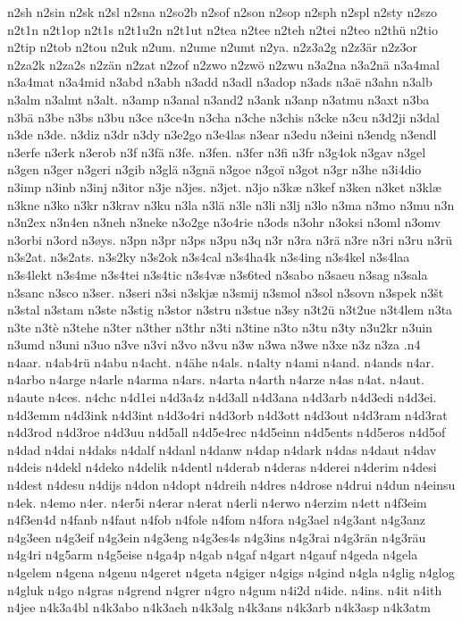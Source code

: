 {{n2sh
n2sin
n2sk
n2sl
n2sna
n2so2b
n2sof
n2son
n2sop
n2sph
n2spl
n2sty
n2szo
n2t1n
n2t1op
n2t1s
n2t1u2n
n2t1ut
n2tea
n2tee
n2teh
n2tei
n2teo
n2thü
n2tio
n2tip
n2tob
n2tou
n2uk
n2um.
n2ume
n2umt
n2ya.
n2z3a2g
n2z3är
n2z3or
n2za2k
n2za2s
n2zän
n2zat
n2zof
n2zwo
n2zwö
n2zwu
n3a2na
n3a2nä
n3a4mal
n3a4mat
n3a4mid
n3abd
n3abh
n3add
n3adl
n3adop
n3ads
n3aë
n3ahn
n3alb
n3alm
n3almt
n3alt.
n3amp
n3anal
n3and2
n3ank
n3anp
n3atmu
n3axt
n3ba
n3bä
n3be
n3bs
n3bu
n3ce
n3ce4n
n3cha
n3che
n3chis
n3cke
n3cu
n3d2ji
n3dal
n3de
n3de.
n3diz
n3dr
n3dy
n3e2go
n3e4las
n3ear
n3edu
n3eini
n3endg
n3endl
n3erfe
n3erk
n3erob
n3f
n3fä
n3fe.
n3fen.
n3fer
n3fi
n3fr
n3g4ok
n3gav
n3gel
n3gen
n3ger
n3geri
n3gib
n3glä
n3gnä
n3goe
n3goï
n3got
n3gr
n3he
n3i4dio
n3imp
n3inb
n3inj
n3itor
n3je
n3jes.
n3jet.
n3jo
n3kæ
n3kef
n3ken
n3ket
n3klæ
n3kne
n3ko
n3kr
n3krav
n3ku
n3la
n3lä
n3le
n3li
n3lj
n3lo
n3ma
n3mo
n3mu
n3n
n3n2ex
n3n4en
n3neh
n3neke
n3o2ge
n3o4rie
n3ods
n3ohr
n3oksi
n3oml
n3omv
n3orbi
n3ord
n3øys.
n3pn
n3pr
n3ps
n3pu
n3q
n3r
n3ra
n3rä
n3re
n3ri
n3ru
n3rü
n3s2at.
n3s2ats.
n3s2ky
n3s2ok
n3s4cal
n3s4ha4k
n3s4ing
n3s4kel
n3s4laa
n3s4lekt
n3s4me
n3s4tei
n3s4tic
n3s4væ
n3s6ted
n3sabo
n3saeu
n3sag
n3sala
n3sanc
n3sco
n3ser.
n3seri
n3si
n3skjæ
n3smij
n3smol
n3sol
n3sovn
n3spek
n3št
n3stal
n3stam
n3ste
n3stig
n3stor
n3stru
n3stue
n3sy
n3t2ü
n3t2ue
n3t4lem
n3ta
n3te
n3tè
n3tehe
n3ter
n3ther
n3thr
n3ti
n3tine
n3to
n3tu
n3ty
n3u2kr
n3uin
n3umd
n3uni
n3uo
n3ve
n3vi
n3vo
n3vu
n3w
n3wa
n3we
n3xe
n3z
n3za
.n4
n4aar.
n4ab4rü
n4abu
n4acht.
n4ähe
n4als.
n4alty
n4ami
n4and.
n4ands
n4ar.
n4arbo
n4arge
n4arle
n4arma
n4ars.
n4arta
n4arth
n4arze
n4as
n4at.
n4aut.
n4aute
n4ces.
n4chc
n4d1ei
n4d3a4z
n4d3all
n4d3ana
n4d3arb
n4d3edi
n4d3ei.
n4d3emm
n4d3ink
n4d3int
n4d3o4ri
n4d3orb
n4d3ott
n4d3out
n4d3ram
n4d3rat
n4d3rod
n4d3roe
n4d3uu
n4d5all
n4d5e4rec
n4d5einn
n4d5ents
n4d5eros
n4d5of
n4dad
n4dai
n4daks
n4dalf
n4danl
n4danw
n4dap
n4dark
n4das
n4daut
n4dav
n4deis
n4dekl
n4deko
n4delik
n4dentl
n4derab
n4deras
n4derei
n4derim
n4desi
n4dest
n4desu
n4dijs
n4don
n4dopt
n4dreih
n4dres
n4drose
n4drui
n4dun
n4einsu
n4ek.
n4emo
n4er.
n4er5i
n4erar
n4erat
n4erli
n4erwo
n4erzim
n4ett
n4f3eim
n4f3en4d
n4fanb
n4faut
n4fob
n4fole
n4fom
n4fora
n4g3ael
n4g3ant
n4g3anz
n4g3een
n4g3eif
n4g3ein
n4g3eng
n4g3es4s
n4g3ins
n4g3rai
n4g3rän
n4g3räu
n4g4ri
n4g5arm
n4g5eise
n4ga4p
n4gab
n4gaf
n4gart
n4gauf
n4geda
n4gela
n4gelem
n4gena
n4genu
n4geret
n4geta
n4giger
n4gigs
n4gind
n4gla
n4glig
n4glog
n4gluk
n4go
n4gras
n4grend
n4grer
n4gro
n4gum
n4i2d
n4ide.
n4ins.
n4it
n4ith
n4jee
n4k3a4bl
n4k3abo
n4k3aeh
n4k3alg
n4k3ans
n4k3arb
n4k3asp
n4k3atm
}}
